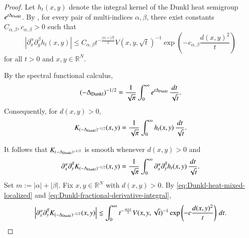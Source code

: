 \documentclass[12pt]{amsart}
\begin{document}
\begin{proof}
Let $h_t(x,y)$ denote the integral kernel of the Dunkl heat semigroup
$e^{t\Delta_{{\rm Dunkl}}}$. By
\cite[Theorem~4.1(d)]{MR4014802}, for every pair of multi-indices
$\alpha,\beta$, there exist constants
$C_{\alpha,\beta},c_{\alpha,\beta}>0$ such that
\begin{equation}\label{eq:Dunkl-heat-mixed-localized}
\left|
\partial_x^\alpha\partial_y^\beta h_t(x,y)
\right|
\leq
C_{\alpha,\beta}
t^{-\frac{|\alpha|+|\beta|}{2}}
V(x,y,\sqrt t)^{-1}
\exp\left(
-c_{\alpha,\beta}\frac{d(x,y)^2}{t}
\right)
\end{equation}
for all $t>0$ and $x,y\in\mathbb R^N$.


By the spectral functional calculus,
\[
(-\Delta_{{\rm Dunkl}})^{-1/2}
=
\frac{1}{\sqrt{\pi}}
\int_0^\infty
e^{t\Delta_{{\rm Dunkl}}}\,
\frac{dt}{\sqrt t}.
\]
Consequently, for $d(x,y)>0$,
\begin{equation}\label{eq:Dunkl-fractional-kernel-localized}
K_{(-\Delta_{{\rm Dunkl}})^{-1/2}}(x,y)
=
\frac{1}{\sqrt{\pi}}
\int_0^\infty
h_t(x,y)\,\frac{dt}{\sqrt t}.
\end{equation}

It follows that
$K_{(-\Delta_{{\rm Dunkl}})^{-1/2}}$ is smooth whenever $d(x,y)>0$ and
\begin{equation}\label{eq:Dunkl-fractional-derivative-integral}
\partial_x^\alpha\partial_y^\beta
K_{(-\Delta_{{\rm Dunkl}})^{-1/2}}(x,y)
=
\frac{1}{\sqrt{\pi}}
\int_0^\infty
\partial_x^\alpha\partial_y^\beta h_t(x,y)
\,\frac{dt}{\sqrt t}.
\end{equation}
Set
$
m:=|\alpha|+|\beta|.
$
Fix $x,y\in\mathbb R^N$ with $d(x,y)>0$. By
\eqref{eq:Dunkl-heat-mixed-localized} and
\eqref{eq:Dunkl-fractional-derivative-integral},
\begin{equation}\label{eq:K-derivative-volume}
\left|
\partial_x^\alpha\partial_y^\beta
K_{(-\Delta_{{\rm Dunkl}})^{-1/2}}(x,y)
\right|
\lesssim
\int_0^\infty
t^{-\frac{m+1}{2}}
V(x,y,\sqrt t)^{-1}
\exp\left(
-c\frac{d(x,y)^2}{t}
\right)\,dt.
\end{equation}


\end{proof}
\end{document}
